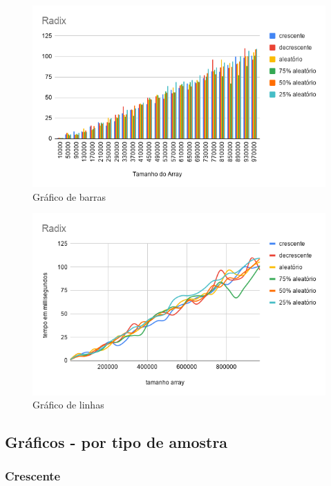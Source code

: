\documentclass[a4paper, 12pt]{article}
\begin{document}
	\begin{figure}[!h]
		\caption{ Gráfico de barras }
		\label{fig:radix1}
		\centering
	\includegraphics[width=1\textwidth, height=0.60\textwidth]{Radix}

	\end{figure}
	\begin{figure}[!h]
		\caption{ Gráfico de linhas }
		\label{fig:radix2}
		\centering
		\includegraphics[width=1\textwidth, height=0.57\textwidth]{Radix_linha}
	\end{figure}




\newpage
\subsection{Gráficos - por tipo de amostra }


\subsubsection{Crescente}
\end{document}
